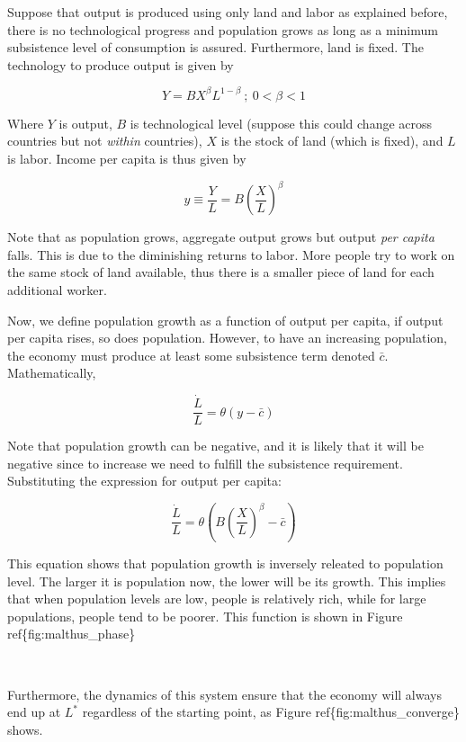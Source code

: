 \documentclass[11pt]{article}
\begin{document}
Suppose that output is produced using only land and labor as explained
before, there is no technological progress and population grows as long
as a minimum subsistence level of consumption is assured. Furthermore,
land is fixed. The technology to produce output is given by

\[
Y = B X^{\beta}L^{1-\beta} \ ; \ 0 < \beta < 1
\]

Where \(Y\) is output, \(B\) is technological level (suppose this could
change across countries but not \emph{within} countries), \(X\) is the
stock of land (which is fixed), and \(L\) is labor. Income per capita is
thus given by

\[
y \equiv \frac{Y}{L} = B\left(\frac{X}{L}\right)^{\beta}
\]

Note that as population grows, aggregate output grows but output
\emph{per capita} falls. This is due to the diminishing returns to
labor. More people try to work on the same stock of land available, thus
there is a smaller piece of land for each additional worker.

Now, we define population growth as a function of output per capita, if
output per capita rises, so does population. However, to have an
increasing population, the economy must produce at least some
subsistence term denoted \(\bar{c}\). Mathematically,

\[
\frac{\dot{L}}{L} = \theta\left(y - \bar{c}\right)
\]

Note that population growth can be negative, and it is likely that it
will be negative since to increase we need to fulfill the subsistence
requirement. Substituting the expression for output per capita:

\[
\frac{\dot{L}}{L} = \theta\left(B\left(\frac{X}{L}\right)^{\beta} - \bar{c}\right)
\]

This equation shows that population growth is inversely releated to
population level. The larger it is population now, the lower will be its
growth. This implies that when population levels are low, people is
relatively rich, while for large populations, people tend to be poorer.
This function is shown in Figure ref\{fig:malthus\_phase\}

    \begin{center}
    \end{center}
    { \hspace*{\fill} \\}
    
    Furthermore, the dynamics of this system ensure that the economy will
always end up at \(L^*\) regardless of the starting point, as Figure
ref\{fig:malthus\_converge\} shows.
\end{document}

